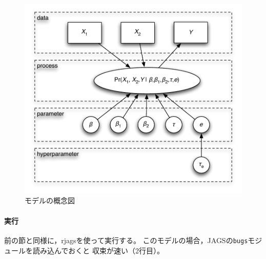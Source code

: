 \documentclass[11pt,uplatex]{jsarticle}
\begin{document}
\begin{figure}[htbp]
	\begin{center}
		\includegraphics[bb=0 0 440 384, clip, width=320 bp]{example3_schema.pdf}
	\end{center}
	\caption{モデルの概念図}
	\label{example3_schema}
\end{figure}


\paragraph{実行}

前の節と同様に，\textsf{rjags}を使って実行する。
このモデルの場合，\textsf{JAGS}の\texttt{bugs}モジュールを読み込んでおくと
収束が速い（2行目）。
\end{document}
